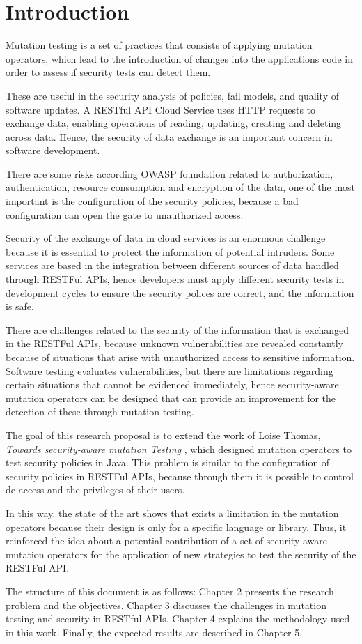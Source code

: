 \chapter*{Introduction}

Mutation testing is a set of practices that consists of applying mutation operators, which lead to the introduction of changes 
into the applications code in order to assess if security tests can detect them.

These are useful in the security analysis of policies\cite{8967426}, fail models\cite{6569774}, and quality of software updates\cite{kravets2012feasibility}. 
A RESTful API Cloud Service uses HTTP requests to exchange data, enabling operations of reading, updating, creating and deleting across data.
Hence, the security of data exchange is an important concern in software development.

There are some risks according OWASP foundation related to authorization, authentication, resource consumption and encryption of the data, 
one of the most important is the configuration of the security policies, because a bad configuration can open the gate to unauthorized access.

Security of the exchange of data in cloud services is an enormous challenge because it is essential to protect the information of potential intruders. 
Some services are based in the integration between different sources of data handled through RESTFul APIs, 
hence developers must apply different security tests in development cycles to ensure the security polices are correct, and the information is safe.

There are challenges related to the security of the information that is exchanged in the RESTFul APIs, 
because unknown vulnerabilities are revealed constantly because of situations that arise with unauthorized access to sensitive information. 
Software testing evaluates vulnerabilities, but there are limitations regarding certain situations that cannot be evidenced immediately, 
hence security-aware mutation operators can be designed that can provide an improvement for the detection of these through mutation testing.

The goal of this research proposal is to extend the work of Loise Thomas, \textit{Towards security-aware mutation Testing} \cite{Loise2017}, 
which designed mutation operators to test security policies in Java. This problem is similar to the configuration of security policies in RESTFul APIs, 
because through them it is possible to control de access and the privileges of their users.

In this way, the state of the art shows that exists a limitation in the mutation operators because their design is only for a specific language or library. 
Thus, it reinforced the idea about a potential contribution of a set of security-aware mutation operators for the application of new strategies to test 
the security of the RESTFul API.

The structure of this document is as follows: Chapter 2 presents the research problem and the objectives. 
Chapter 3 discusses the challenges in mutation testing and security in RESTful APIs. 
Chapter 4 explains the methodology used in this work. Finally, the expected results are described in Chapter 5.
